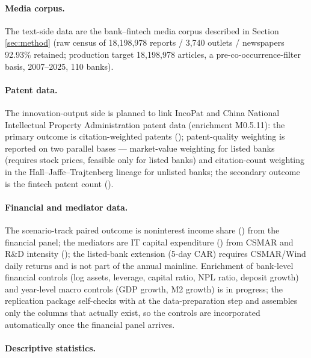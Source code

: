 \paragraph{Media corpus.}
The text-side data are the bank--fintech media corpus described in Section
\ref{sec:method} (raw census of 18{,}198{,}978 reports / 3{,}740 outlets / newspapers
92.93\% retained; production target 18{,}198{,}978 articles, a pre-co-occurrence-filter
basis, 2007--2025, 110 banks).

\paragraph{Patent data.}
The innovation-output side is planned to link IncoPat and China National Intellectual
Property Administration patent data (enrichment M0.5.11): the primary outcome is
citation-weighted patents (); patent-quality weighting
is reported on two parallel bases — \textcite{kogan2017technological} market-value
weighting for listed banks (requires stock prices, feasible only for listed banks) and
citation-count weighting in the Hall--Jaffe--Trajtenberg lineage for unlisted banks;
the secondary outcome is the fintech patent count ().

\paragraph{Financial and mediator data.}
The scenario-track paired outcome is noninterest income share
() from the financial panel; the mediators are IT
capital expenditure () from CSMAR and R\&D intensity
(); the listed-bank extension (5-day CAR) requires CSMAR/Wind
daily returns and is not part of the annual mainline. Enrichment of bank-level financial
controls (log assets, leverage, capital ratio, NPL ratio, deposit growth) and year-level
macro controls (GDP growth, M2 growth) is in progress; the replication package
self-checks with  at the data-preparation step and assembles only
the columns that actually exist, so the controls are incorporated automatically once the
financial panel arrives.

\paragraph{Descriptive statistics.}

